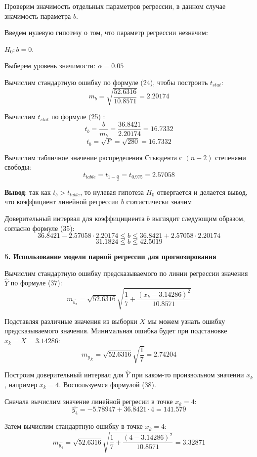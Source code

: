 \documentclass[aps,%
12pt,%
final,%
oneside,
onecolumn,%
musixtex, %
superscriptaddress,%
centertags]{article} %
\begin{document}
Проверим значимость отдельных параметров регрессии, в данном случае значимость параметра $b$.

Введем нулевую гипотезу о том, что параметр регрессии незначим:
\begin{center} $H_0: b=0$. \end{center}

Выберем уровень значимости: $\alpha = 0.05$

Вычислим стандартную ошибку по формуле (24), чтобы построить $t_{stat}$:
$$ m_b = \sqrt { \frac{52.6316}{10.8571}} = 2.20174 $$

Вычислим $t_{stat}$ по формуле (25) :
$$t_b = \frac{b}{m_b} = \frac{36.8421}{2.20174} = 16.7332 $$
$$t_b = \sqrt {F} = \sqrt{280} = 16.7332 $$

Вычислим табличное значение распределения Стьюдента с $(n-2)$ степенями свободы:
$$ t_{table} = t_{1 - \frac{\alpha}{2}} = t_{0.975} = 2.57058$$  

\textbf{Вывод}: так как $t_b > t_{table}$, то нулевая гипотеза $H_0$ отвергается и делается вывод, что коэффициент линейной регрессии $b$ статистически значим

Доверительный интервал для коэффицициента $b$ выглядит следующим образом, согласно формуле (35):
$$36.8421 - 2.57058 \cdot 2.20174 \leq b \leq 36.8421 + 2.57058 \cdot 2.20174  $$
$$31.1824 \leq b \leq 42.5019 $$

\begin{center}
\textbf{5. Использование модели парной регрессии для прогнозирования} 
\end{center}

Вычислим стандартную ошибку предсказываемого по линии регрессии значения $\hat{Y}$ по формуле (37):
$$ m_{\hat{y_x}} = \sqrt{52.6316} \sqrt{\frac{1}{7} + \frac{(x_k-3.14286)^2}{10.8571}} $$

Подставляя различные значения из выборки $X$ мы можем узнать ошибку предсказываемого значения. Минимальная ошибка будет при подстановке $x_k = \overline{X}=3.14286$:
$$ m_{y_{\overline{X}}} = \sqrt{52.6316} \sqrt{\frac{1}{7}} = 2.74204$$

Построим доверительный интервал для $\hat{Y}$ при каком-то произвольном значении $x_k$, например $x_k = 4$. Воспользуемся формулой (38).

Сначала вычислим значение линейной регресии в точке $x_k=4$:
$$ \hat{y_{4}} = -5.78947 + 36.8421\cdot4 = 141.579$$

Затем вычислим стандартную ошибку в точке $x_k=4$:
$$ m_{\hat{y_4}} = \sqrt{52.6316} \sqrt{\frac{1}{7} + \frac{(4-3.14286)^2}{10.8571}} = 3.32871$$
\end{document}
